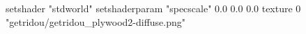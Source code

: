 setshader "stdworld"
setshaderparam "specscale" 0.0 0.0 0.0
texture 0 "getridou/getridou_plywood2-diffuse.png"
